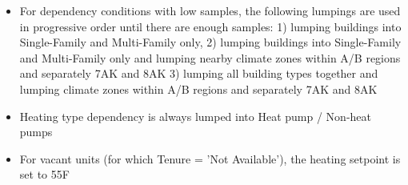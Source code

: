 \begin{itemize}
\item For dependency conditions with low samples, the following lumpings are used in progressive order until there are enough samples: 1) lumping buildings into Single-Family and Multi-Family only,  2) lumping buildings into Single-Family and Multi-Family only and lumping nearby climate zones within  A/B regions and separately 7AK and 8AK 3) lumping all building types together and lumping climate zones within A/B regions and separately 7AK and 8AK
\item Heating type dependency is always lumped into Heat pump / Non-heat pumps
\item For vacant units (for which Tenure = 'Not Available'), the heating setpoint is set to 55F
\end{itemize}
